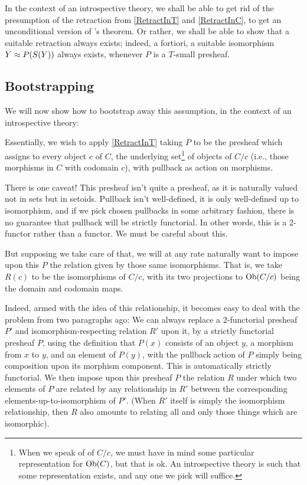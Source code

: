 In the context of an introspective theory, we shall be able to get rid of the presumption of the retraction from \cref{RetractInT} and \cref{RetractInC}, to get an unconditional version of \Loeb's theorem. Or rather, we shall be able to show that a suitable retraction always exists; indeed, a fortiori, a suitable isomorphism $Y \approx P(S(Y))$ always exists, whenever $P$ is a $T$-small presheaf.

\subsection{Bootstrapping}
We will now show how to bootstrap away this assumption, in the context of an introspective theory:

Essentially, we wish to apply \cref{RetractInT} taking $P$ to be the presheaf which assigns to every object $c$ of $C$, the underlying set\footnote{When we speak of  of $C/c$, we must have in mind some particular representation for $\operatorname{Ob}(C)$, but that is ok. An introspective theory is such that some representation exists, and any one we pick will suffice.} of objects of $C/c$ (i.e., those morphisms in $C$ with codomain $c$), with pullback as action on morphisms.

There is one caveat! This presheaf isn't quite a presheaf, as it is naturally valued not in sets but in setoids. Pullback isn't well-defined, it is only well-defined up to isomorphism, and if we pick chosen pullbacks in some arbitrary fashion, there is no guarantee that pullback will be strictly functorial. In other words, this is a 2-functor rather than a functor. We must be careful about this.

But supposing we take care of that, we will at any rate naturally want to impose upon this $P$ the relation given by those same isomorphisms. That is, we take $R(c)$ to be the isomorphisms of $C/c$, with its two projections to $\operatorname{Ob}(C/c)$ being the domain and codomain maps.

Indeed, armed with the idea of this relationship, it becomes easy to deal with the problem from two paragraphs ago: We can always replace a 2-functorial presheaf $P'$ and isomorphism-respecting relation $R'$ upon it, by a strictly functorial presheaf $P$, using the definition that $P(x)$ consists of an object $y$, a morphism from $x$ to $y$, and an element of $P(y)$, with the pullback action of $P$ simply being composition upon its morphism component. This is automatically strictly functorial. We then impose upon this presheaf $P$ the relation $R$ under which two elements of $P$ are related by any relationship in $R'$ between the corresponding elements-up-to-isomorphism of $P'$. (When $R'$ itself is simply the isomorphism relationship, then $R$ also amounts to relating all and only those things which are isomorphic). 

